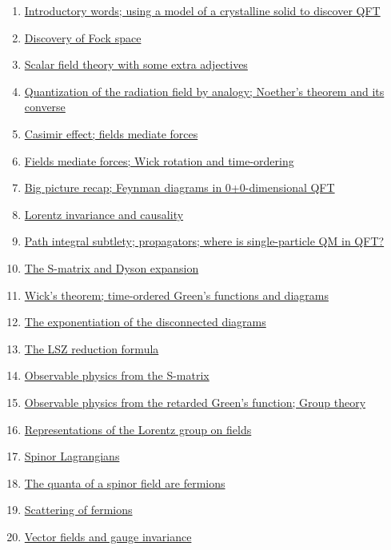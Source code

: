 \documentclass[11pt]{article}
\begin{document}
\begin{enumerate}
	\item	\href{https://mp.weixin.qq.com/s/CeocxWNTHxJFWucT8s_EGg}{Introductory words; using a model of a crystalline solid to discover QFT}	%
	\item	\href{https://mp.weixin.qq.com/s/5Q-YEqzFVVFdDjiYyTFRBQ}{Discovery of Fock space}	%
	\item	\href{https://mp.weixin.qq.com/s/CwAvO9NbTlkCIKWdHQycZw}{Scalar field theory with some extra adjectives} 	%
	\item 	\href{https://mp.weixin.qq.com/s/1-eae_NEuDAfiTuWkF5GTg}{Quantization of the radiation field by analogy; Noether's theorem and its converse}	%
	\item 	\href{https://mp.weixin.qq.com/s/bKftVzY-3vibwbKtvRnRWA}{Casimir effect; fields mediate forces}	%
	\item 	\href{https://mp.weixin.qq.com/s/Y8JFkVdT64ftLWVw_no9NA}{Fields mediate forces; Wick rotation and time-ordering}	%
	\item 	\href{https://mp.weixin.qq.com/s/JxheE9xN5TcjtkFzaQ869g}{Big picture recap; Feynman diagrams in 0+0-dimensional QFT}	%
	\item 	\href{https://mp.weixin.qq.com/s/E6pjeqkApjnHlk5AzCOWdg}{Lorentz invariance and causality}	%
	\item 	\href{https://mp.weixin.qq.com/s/_u3OqrandFURDnXkYkahXA}{Path integral subtlety; propagators; where is single-particle QM in QFT?}	%
	\item 	\href{https://mp.weixin.qq.com/s/-W1X810Wa50UxETzEuJmWg}{The S-matrix and Dyson expansion}	%
	\item	\href{https://mp.weixin.qq.com/s/dFlOhlNjuaryhUd-IUxeFw}{Wick's theorem; time-ordered Green's functions and diagrams}	%
	\item	\href{https://mp.weixin.qq.com/s/pRjwCTMvjLgaK-PRihDNXQ}{The exponentiation of the disconnected diagrams}	%
	\item	\href{https://mp.weixin.qq.com/s/OucIs79RO5HQMKGykI68_Q}{The LSZ reduction formula} 	%
	\item 	\href{https://mp.weixin.qq.com/s/dAcufQEYjvwnJ2LVxhelVA}{Observable physics from the S-matrix}	%
	\item 	\href{https://mp.weixin.qq.com/s/IJsZVpYEE_-B9sz0n6Emlg}{Observable physics from the retarded Green's function; Group theory}	%
	\item 	\href{https://mp.weixin.qq.com/s/9qrn5apMZqE7Mc1ZF6z2Uw}{Representations of the Lorentz group on fields}	%
	\item 	\href{https://mp.weixin.qq.com/s/EA5TPmFekZMOwIQeoFdApg}{Spinor Lagrangians}	%
	\item 	\href{https://mp.weixin.qq.com/s/Gh_nBIWyc7MnWbeAQO1lRA}{The quanta of a spinor field are fermions}	%
	\item 	\href{https://mp.weixin.qq.com/s/I4cK6Ynh-2SQdhpj8WfKvg}{Scattering of fermions}	%
	\item 	\href{https://mp.weixin.qq.com/s/gTEv-17cXNYpIzWVFJfjFw}{Vector fields and gauge invariance}	%
\end{enumerate}
\end{document}
